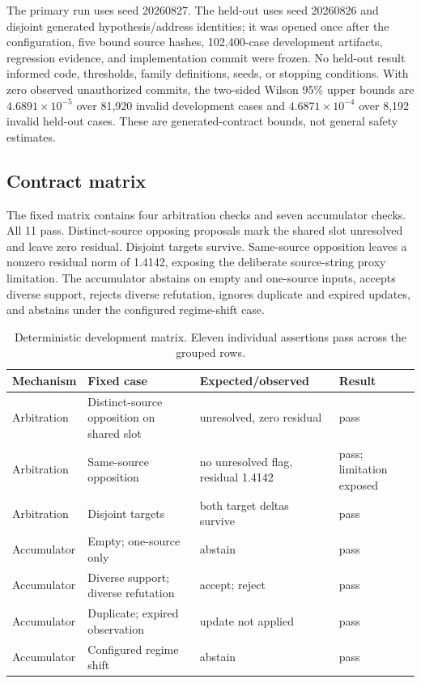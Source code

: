 \documentclass[10pt]{article}
\begin{document}
The primary run uses seed 20260827. The held-out uses seed 20260826 and disjoint generated hypothesis/address identities; it was opened once after the configuration, five bound source hashes, 102,400-case development artifacts, regression evidence, and implementation commit were frozen. No held-out result informed code, thresholds, family definitions, seeds, or stopping conditions. With zero observed unauthorized commits, the two-sided Wilson 95\% upper bounds are $4.6891\times10^{-5}$ over 81,920 invalid development cases and $4.6871\times10^{-4}$ over 8,192 invalid held-out cases. These are generated-contract bounds, not general safety estimates.

\subsection{Contract matrix}

The fixed matrix contains four arbitration checks and seven accumulator checks. All 11 pass. Distinct-source opposing proposals mark the shared slot unresolved and leave zero residual. Disjoint targets survive. Same-source opposition leaves a nonzero residual norm of 1.4142, exposing the deliberate source-string proxy limitation. The accumulator abstains on empty and one-source inputs, accepts diverse support, rejects diverse refutation, ignores duplicate and expired updates, and abstains under the configured regime-shift case.

\begin{table}[!htbp]
\centering
\small
\begin{tabularx}{0.995\textwidth}{@{}>{\raggedright\arraybackslash}p{}Y>{\raggedright\arraybackslash}p{0.17\textwidth}>{\raggedright\arraybackslash}p{0.13\textwidth}@{}}
\toprule
Mechanism & Fixed case & Expected/observed & Result \\
\midrule
Arbitration & Distinct-source opposition on shared slot & unresolved, zero residual & pass \\
Arbitration & Same-source opposition & no unresolved flag, residual 1.4142 & pass; limitation exposed \\
Arbitration & Disjoint targets & both target deltas survive & pass \\
Accumulator & Empty; one-source only & abstain & pass \\
Accumulator & Diverse support; diverse refutation & accept; reject & pass \\
Accumulator & Duplicate; expired observation & update not applied & pass \\
Accumulator & Configured regime shift & abstain & pass \\
\bottomrule
\end{tabularx}
\caption{Deterministic development matrix. Eleven individual assertions pass across the grouped rows.}
\label{tab:matrix}
\end{table}
\end{document}
